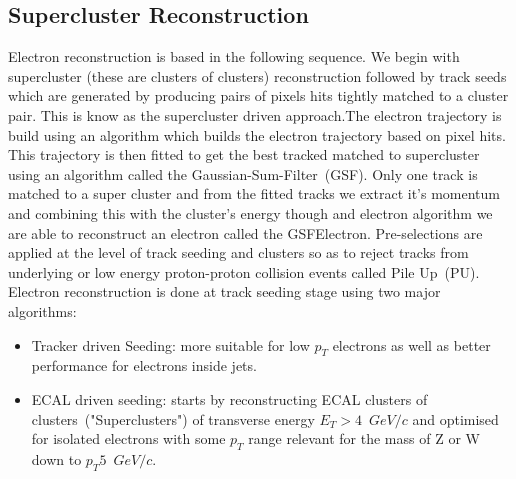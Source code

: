 \subsection{Supercluster Reconstruction}
Electron reconstruction is based in the following sequence. We begin with supercluster (these are clusters of clusters) reconstruction followed by track seeds which are generated by producing  pairs of pixels hits tightly matched to a cluster pair. This is know as the supercluster driven approach.The electron trajectory is build using an algorithm which builds the electron trajectory based on pixel hits. This trajectory is then fitted to get the best tracked matched to supercluster using an algorithm called the Gaussian-Sum-Filter~(GSF).  Only one track is matched to a super cluster and from the fitted tracks we extract it's momentum and combining this with the cluster's energy though and electron algorithm we are able to reconstruct an electron called the GSFElectron. Pre-selections are applied at the level of track seeding and clusters so as to reject tracks from underlying or low energy proton-proton collision events called Pile Up~(PU). 
\newline
Electron reconstruction is done at track seeding stage using two major algorithms:
\begin{itemize} 
\item Tracker driven Seeding: more suitable for low $p_{T}$ electrons as well as better performance for electrons inside jets.
\item ECAL driven seeding: starts by reconstructing ECAL clusters of clusters~("Superclusters") of transverse energy $E_{T} > 4$~$GeV/c$ and optimised for isolated  electrons with some
    $p_{T}$ range  relevant for the mass of Z or W down to  $p_{T} 5$~$GeV/c$.
\end{itemize}

